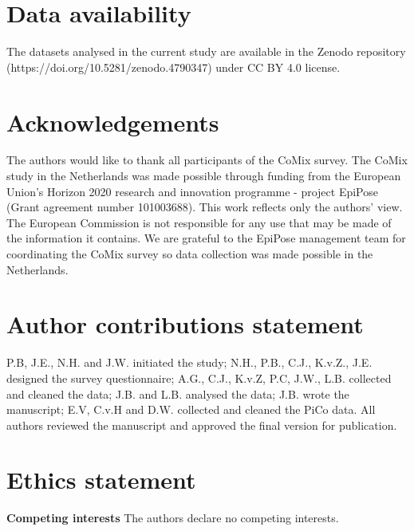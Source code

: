 \documentclass[fleqn,10pt]{wlscirep}
\begin{document}
\section*{Data availability} The datasets analysed in the current study are available in the Zenodo repository (https://doi.org/10.5281/zenodo.4790347) \cite{Zenodo_2022} under CC BY 4.0 license.



\section*{Acknowledgements}

The authors would like to thank all participants of the CoMix survey. The CoMix study in the Netherlands was made possible through funding from the European Union's Horizon 2020 research and innovation programme - project EpiPose (Grant agreement number 101003688). This work reflects only the authors’ view. The European Commission is not responsible for any use that may be made of the information it contains. We are grateful to the EpiPose management team for coordinating the CoMix survey so data collection was made possible in the Netherlands. 

\section*{Author contributions statement}

P.B, J.E., N.H. and J.W. initiated the study; N.H., P.B., C.J., K.v.Z., J.E. designed the survey questionnaire; A.G., C.J., K.v.Z, P.C, J.W., L.B. collected and cleaned the data; J.B. and L.B. analysed the data; J.B. wrote the manuscript; E.V, C.v.H and D.W. collected and cleaned the PiCo data. All authors reviewed the manuscript and approved the final version for publication. 

\section*{Ethics statement}

\textbf{Competing interests} The authors declare no competing interests.

\clearpage
\end{document}
